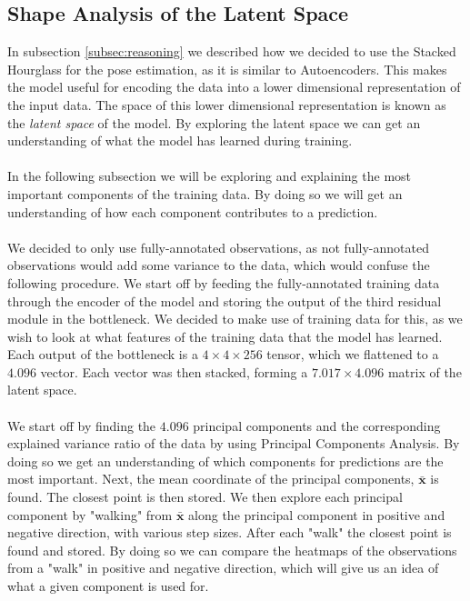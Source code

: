 \documentclass[./main.tex]{subfiles}
\begin{document}
\subsection{Shape Analysis of the Latent Space}\label{subsec:shape_analysis}
In subsection \ref{subsec:reasoning} we described how we decided to use the Stacked Hourglass for the pose estimation, as it is similar to Autoencoders. This makes the model useful for encoding the data into a lower dimensional representation of the input data. The space of this lower dimensional representation is known as the \textit{latent space} of the model. By exploring the latent space we can get an understanding of what the model has learned during training.
\\
\\
In the following subsection we will be exploring and explaining the most important components of the training data. By doing so we will get an understanding of how each component contributes to a prediction.
\\
\\
We decided to only use fully-annotated observations, as not fully-annotated observations would add some variance to the data, which would confuse the following procedure. We start off by feeding the fully-annotated training data through the encoder of the model and storing the output of the third residual module in the bottleneck. We decided to make use of training data for this, as we wish to look at what features of the training data that the model has learned. Each output of the bottleneck is a $4 \times 4 \times 256$ tensor, which we flattened to a $4.096$ vector. Each vector was then stacked, forming a $7.017 \times 4.096$ matrix of the latent space.
\\
\\
We start off by finding the $4.096$ principal components and the corresponding explained variance ratio of the data by using Principal Components Analysis. By doing so we get an understanding of which components for predictions are the most important. Next, the mean coordinate of the principal components, $\bar{\bm{x}}$ is found. The closest point is then stored. We then explore each principal component by "walking" from $\bar{\bm{x}}$ along the principal component in positive and negative direction, with various step sizes. After each "walk" the closest point is found and stored. By doing so we can compare the heatmaps of the observations from a "walk" in positive and negative direction, which will give us an idea of what a given component is used for. 
\end{document}
